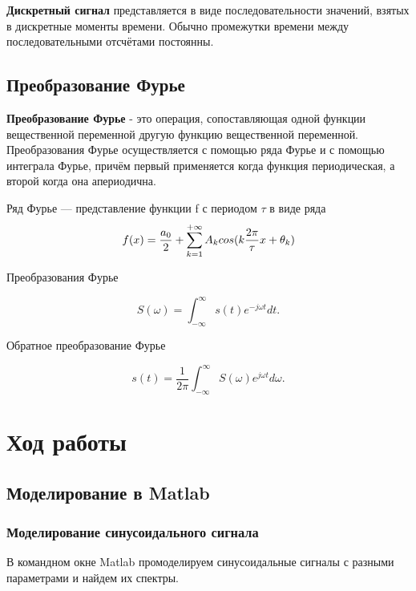 \documentclass[a4paper]{article}
\begin{document}
{\bfseries Дискретный сигнал} представляется в виде последовательности значений, взятых в дискретные моменты времени. Обычно промежутки времени между последовательными отсчётами постоянны.

\subsection{Преобразование Фурье}
{\bfseries Преобразование Фурье} - это операция, сопоставляющая одной функции вещественной переменной другую функцию вещественной переменной. Преобразования Фурье осуществляется с помощью ряда Фурье и с помощью интеграла Фурье, причём первый применяется когда функция периодическая, а второй когда она апериодична.

Ряд Фурье — представление функции  f с периодом $\tau$ в виде ряда
\begin{equation}
f(x) = {a_0\over 2} + \sum_{k=1}^{+\infty}A_k cos(k{2\pi\over 
	\tau}x + \theta_k)
\end{equation}

Преобразования Фурье

\begin{equation}
S(\omega) = \int_{-\infty}^{\infty} s(t)e^{-j\omega t} dt.
\end{equation}

Обратное преобразование Фурье

\begin{equation}
s(t) = \frac{1}{2\pi} \int_{-\infty}^{\infty} S(\omega)e^{j\omega t} d\omega.
\end{equation}

\section{Ход работы}
\subsection{Моделирование в Matlab}
\subsubsection{Моделирование синусоидального сигнала}

В командном окне Matlab промоделируем синусоидальные сигналы с разными параметрами и найдем их спектры. 
\end{document}
